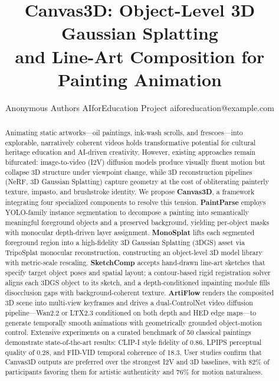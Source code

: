 \documentclass{article}
\title{Canvas3D: Object-Level 3D Gaussian Splatting\\
and Line-Art Composition for Painting Animation}
\author{
    Anonymous Authors
    \affiliations
    AIforEducation Project
    \emails
    aiforeducation@example.com
}
\begin{document}
\maketitle

\begin{abstract}
Animating static artworks---oil paintings, ink-wash scrolls, and frescoes---into
explorable, narratively coherent videos holds transformative potential for
cultural heritage education and AI-driven creativity. However, existing
approaches remain bifurcated: image-to-video (I2V) diffusion models produce
visually fluent motion but collapse 3D structure under viewpoint change, while
3D reconstruction pipelines (NeRF, 3D Gaussian Splatting) capture geometry at
the cost of obliterating painterly texture, impasto, and brushstroke identity.
We propose \textbf{Canvas3D}, a framework integrating four specialized
components to resolve this tension.
\textbf{PaintParse} employs YOLO-family instance segmentation to decompose a
painting into semantically meaningful foreground objects and a preserved
background, yielding per-object masks with monocular depth-driven layer
assignment. \textbf{MonoSplat} lifts each segmented foreground region into a
high-fidelity 3D Gaussian Splatting (3DGS) asset via TripoSplat monocular
reconstruction, constructing an object-level 3D model library with metric-scale
rescaling. \textbf{SketchComp} accepts hand-drawn line-art sketches that specify
target object poses and spatial layout; a contour-based rigid registration
solver aligns each 3DGS object to its sketch, and a depth-conditioned inpainting
module fills disocclusion gaps with background-coherent texture.
\textbf{ArtiFlow} renders the composited 3D scene into multi-view keyframes and
drives a dual-ControlNet video diffusion pipeline---Wan2.2 or LTX2.3 conditioned
on both depth and HED edge maps---to generate temporally smooth animations with
geometrically grounded object-motion control. Extensive experiments on a curated
benchmark of 50 classical paintings demonstrate state-of-the-art results:
CLIP-I style fidelity of 0.86, LPIPS perceptual quality of 0.28, and FID-VID
temporal coherence of 18.3. User studies confirm that Canvas3D outputs are
preferred over the strongest I2V and 3D baselines, with 82\% of participants
favoring them for artistic authenticity and 76\% for motion naturalness.
\end{abstract}









\end{document}
